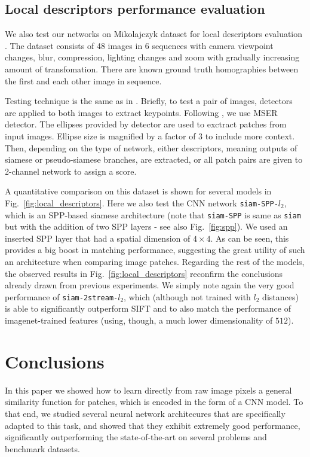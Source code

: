 \documentclass[10pt,twocolumn,letterpaper]{article}
\begin{document}
%





\subsection{Local descriptors performance evaluation}

We also test our networks on Mikolajczyk dataset for
local descriptors evaluation \cite{MS05}. The dataset consists of 48 images in 6 sequences
with camera viewpoint changes, blur, compression, lighting changes and zoom
with gradually increasing amount of transfomation. There are known ground 
truth homographies between the first and each other image in sequence.


Testing technique is the same as in \cite{MS05}. 
%
Briefly, to test a pair of images, detectors are applied
to both images to extract keypoints. Following \cite{comparison}, we use 
MSER detector. 
The ellipses provided by detector are used
to exctract patches from input images. Ellipse size is magnified by a factor of 3
to include more context.
Then, depending on the  type of network, either descriptors, meaning outputs of siamese
or pseudo-siamese branches, are extracted, or all patch pairs are given to 2-channel
network to assign a score.

A quantitative comparison  on this dataset is shown for several models in Fig.~\ref{fig:local_descriptors}.
Here we also test the CNN network  \texttt{siam-SPP-}$l_2$, which is an SPP-based siamese architecture (note that \texttt{siam-SPP} is same as \texttt{siam} but with the addition of two SPP layers - see also Fig.~\ref{fig:spp}). We used an inserted SPP layer that had a spatial dimension of $4\times 4$. As can be seen, this  provides a 
big boost in matching performance,  suggesting the great utility of such an architecture  
when comparing image patches. 
Regarding the rest  of the  models, the observed results in Fig.~\ref{fig:local_descriptors} reconfirm the conclusions already drawn  from  previous experiments. We simply note again the very good performance of \texttt{siam-2stream-}$l_2$, which (although not trained with $l_2$ distances) is able to significantly outperform SIFT and to also match the performance of imagenet-trained features (using, though, a much lower dimensionality of $512$).


%
\section{Conclusions}
%
In this paper we showed how to  learn  directly from raw image pixels a  general similarity function for patches, which is encoded in the form of a CNN model.  To that end, we studied  several neural network architecures  that are specifically  adapted to this task, and showed that they exhibit extremely good performance, significantly outperforming the state-of-the-art on several problems and benchmark datasets.
\end{document}
